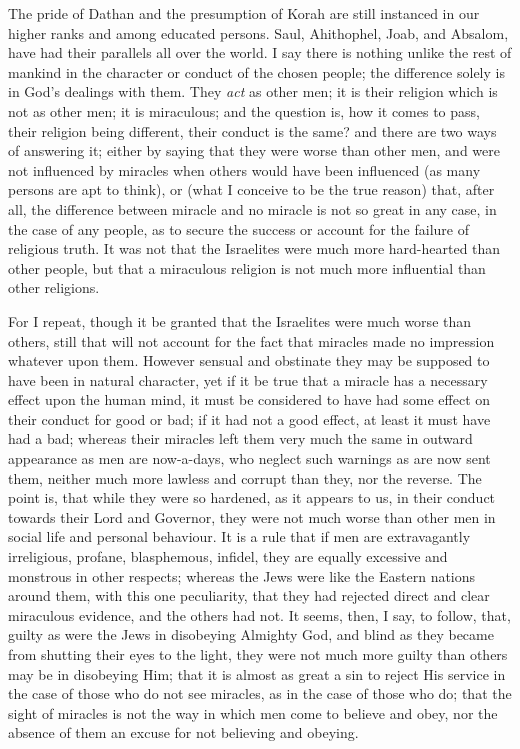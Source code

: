 The pride of Dathan and the presumption of Korah are still
instanced in our higher ranks and among educated persons. Saul,
Ahithophel, Joab, and Absalom, have had their parallels all over the
world. I say there is nothing unlike the rest of mankind in the
character or conduct of the chosen people; the difference solely is in
God's dealings with them. They \emph{act} as other men; it is their
religion which is not as other men; it is miraculous; and the question
is, how it comes to pass, their religion being different, their
conduct is the same? and there are two ways of answering it; either by
saying that they were worse than other men, and were not influenced by
miracles when others would have been influenced (as many persons are
apt to think), or (what I conceive to be the true reason) that, after
all, the difference between miracle and no miracle is not so great in
any case, in the case of any people, as to secure the success or
account for the failure of religious truth. It was not that the
Israelites were much more hard-hearted than other people, but that a
miraculous religion is not much more influential than other religions.

For I repeat, though it be granted that the Israelites were much
worse than others, still that will not account for the fact that
miracles made no impression whatever upon them. However sensual and
obstinate they may be supposed to have been in natural character, yet
if it be true that a miracle has a necessary effect upon the human
mind, it must be considered to have had some effect on their conduct
for good or bad; if it had not a good effect, at least it must have
had a bad; whereas their miracles left them very much the same in
outward appearance as men are now-a-days, who neglect such warnings as
are now sent them, neither much more lawless and corrupt than they,
nor the reverse. The point is, that while they were so hardened, as it
appears to us, in their conduct towards their Lord and Governor, they
were not much worse than other men in social life and personal
behaviour. It is a rule that if men are extravagantly irreligious,
profane, blasphemous, infidel, they are equally excessive and
monstrous in other respects; whereas the Jews were like the Eastern
nations around them, with this one peculiarity, that they had rejected
direct and clear miraculous evidence, and the others had not. It
seems, then, I say, to follow, that, guilty as were the Jews in
disobeying Almighty God, and blind as they became from shutting their
eyes to the light, they were not much more guilty than others may be
in disobeying Him; that it is almost as great a sin to reject His
service in the case of those who do not see miracles, as in the case
of those who do; that the sight of miracles is not the way in which
men come to believe and obey, nor the absence of them an excuse for
not believing and obeying.

